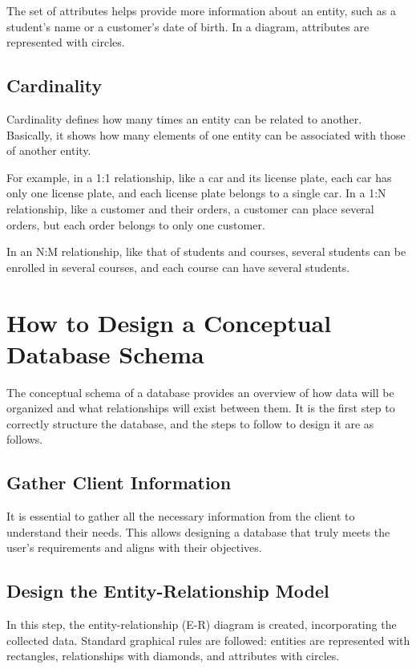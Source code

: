 \documentclass{article}
\begin{document}
The set of attributes helps provide more information about an entity, such as a student's name or a customer's date of birth. In a diagram, attributes are represented with circles.

\subsection{Cardinality}

Cardinality defines how many times an entity can be related to another. Basically, it shows how many elements of one entity can be associated with those of another entity.

For example, in a 1:1 relationship, like a car and its license plate, each car has only one license plate, and each license plate belongs to a single car. In a 1:N relationship, like a customer and their orders, a customer can place several orders, but each order belongs to only one customer.

In an N:M relationship, like that of students and courses, several students can be enrolled in several courses, and each course can have several students.

\section{How to Design a Conceptual Database Schema}

The conceptual schema of a database provides an overview of how data will be organized and what relationships will exist between them. It is the first step to correctly structure the database, and the steps to follow to design it are as follows.

\subsection{Gather Client Information}

It is essential to gather all the necessary information from the client to understand their needs. This allows designing a database that truly meets the user's requirements and aligns with their objectives.

\subsection{Design the Entity-Relationship Model}

In this step, the entity-relationship (E-R) diagram is created, incorporating the collected data. Standard graphical rules are followed: entities are represented with rectangles, relationships with diamonds, and attributes with circles.
\end{document}
